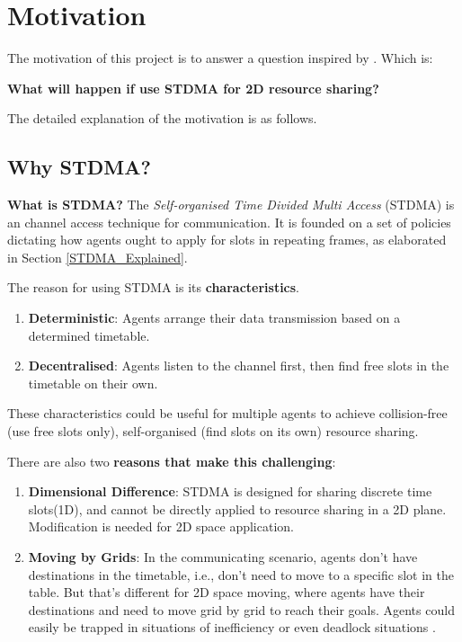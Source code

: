\documentclass[12pt, oneside]{article}
\begin{document}
\section{Motivation}

The motivation of this project is to answer a question inspired by \cite{Paper_From_Supervisor}. Which is:

\begin{displayquote}
\textbf{What will happen if use STDMA for 2D resource sharing?}
\end{displayquote}

The detailed explanation of the motivation is as follows.

\subsection{Why STDMA?}
\label{Why STDMA}
\textbf{What is STDMA?} The \textit{Self-organised Time Divided Multi Access} (STDMA) is an channel access technique for communication. It is founded on a set of policies dictating how agents ought to apply for slots in repeating frames, as elaborated in Section \ref{STDMA_Explained}.

The reason for using STDMA is its \textbf{characteristics}\cite{STDMA_characteristic}. 
\begin{enumerate}
    \item \textbf{Deterministic}: Agents arrange their data transmission based on a determined timetable.
    \item \textbf{Decentralised}: Agents listen to the channel first, then find free slots in the timetable on their own.
\end{enumerate}

These characteristics could be useful for multiple agents to achieve collision-free (use free slots only), self-organised (find slots on its own) resource sharing.

There are also two \textbf{reasons that make this challenging}:
\begin{enumerate}
    \item \textbf{Dimensional Difference}: STDMA is designed for sharing discrete time slots(1D), and cannot be directly applied to resource sharing in a 2D plane. Modification is needed for 2D space application.
    \item \textbf{Moving by Grids}: In the communicating scenario, agents don't have destinations in the timetable, i.e., don't need to move to a specific slot in the table. But that's different for 2D space moving, where agents have their destinations and need to move grid by grid to reach their goals. Agents could easily be trapped in situations of inefficiency or even deadlock situations \cite{MAPF_Deadlock_Explain1,MAPF_Deadlock_Explain2}.
\end{enumerate}
\end{document}
